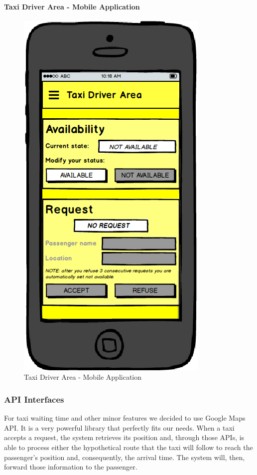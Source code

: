 \paragraph{Taxi Driver Area - Mobile Application}
\begin{figure}[!h]
	\begin{center}
		\includegraphics[scale=0.5]{../SE2_MOCKUPS/MobileAppTaxiDriverArea.png}
		\caption{Taxi Driver Area - Mobile Application}	
	\end{center}
\end{figure}
\newpage
\subsubsection{API Interfaces}
For taxi waiting time and other minor features we decided to use Google Maps API.
It is a very powerful library that perfectly fits our needs.
When a taxi accepts a request, the system retrieves its position and, through
those APIs, is able to process either the hypothetical route that the taxi will
follow to reach the passenger's position and, consequently, the arrival time.
The system will, then, forward those information to the passenger.
